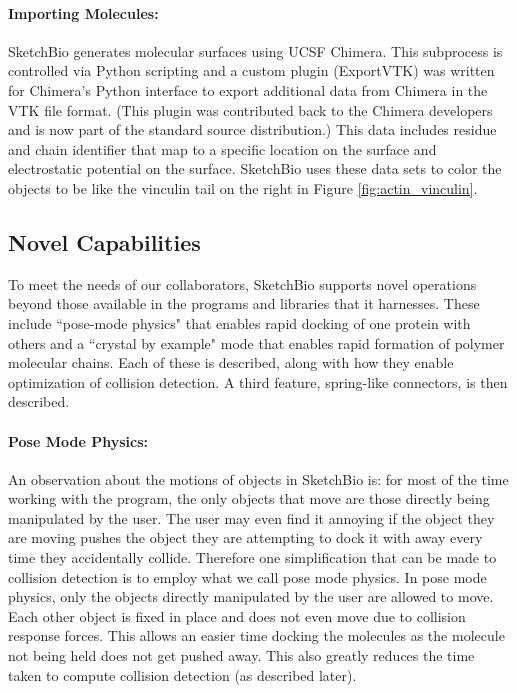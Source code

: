 \documentclass[twocolumn]{bmcart}%
\begin{document}
\paragraph*{Importing Molecules:}
SketchBio generates molecular surfaces using UCSF Chimera.
This subprocess is controlled via Python scripting and a custom plugin (ExportVTK) was written for Chimera's Python interface to export additional data from Chimera in the VTK file format.
(This plugin was contributed back to the Chimera developers and is now part of the standard source distribution.)
This data includes residue and chain identifier that map to a specific location on the surface and electrostatic potential on the surface.
SketchBio uses these data sets to color the objects to be like the vinculin tail on the right in Figure \ref{fig:actin_vinculin}.

\subsection*{Novel Capabilities}

To meet the needs of our collaborators, SketchBio supports novel operations beyond those available in the programs and libraries that it harnesses.
These include ``pose-mode physics" that enables rapid docking of one protein with others and a ``crystal by example" mode that enables rapid formation of polymer molecular chains.
Each of these is described, along with how they enable optimization of collision detection.  A third feature, spring-like connectors, is then described.

\paragraph*{Pose Mode Physics:}
An observation about the motions of objects in SketchBio is: for most of the time working with the program, the only objects that move are those directly being manipulated by the user.
The user may even find it annoying if the object they are moving pushes the object they are attempting to dock it with away every time they accidentally collide.
Therefore one simplification that can be made to collision detection is to employ what we call pose mode physics.
In pose mode physics, only the objects directly manipulated by the user are allowed to move.
Each other object is fixed in place and does not even move due to collision response forces.
This allows an easier time docking the molecules as the molecule not being held does not get pushed away.
This also greatly reduces the time taken to compute collision detection (as described later).
\end{document}
